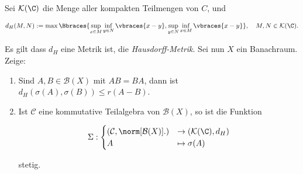 \begin{exercise}[22/2$^\ast$]

Sei $\mathcal{K}(\C)$ die Menge aller kompakten Teilmengen von $C$, und

\begin{align*}
  d_H(M, N)
  :=
  \max \Bbraces
  {
    \sup_{x \in M} \inf_{y \in N} \vbraces{x - y},
    \sup_{y \in N} \inf_{x \in M} \vbraces{x - y}
  },
  \quad
  M, N \in \mathcal{K}(\C).
\end{align*}

Es gilt dass $d_H$ eine Metrik ist, die \textit{Hausdorff-Metrik}.
Sei nun $X$ ein Banachraum.
Zeige:

\begin{enumerate}[label = (\alph*)]

  \item
  Sind $A, B \in \mathcal{B}(X)$ mit $A B = B A$, dann ist $d_H(\sigma(A), \sigma(B)) \leq r(A - B)$.

  \item
  Ist $\mathcal{C}$ eine kommutative Teilalgebra von $\mathcal{B}(X)$, so ist die Funktion

  \begin{align*}
    \Sigma:
    \begin{cases}
      (\mathcal{C}, \norm[\mathcal{B}(X)]{.}) & \to (\mathcal{K}(\C), d_H) \\
      A & \mapsto \sigma(A)
    \end{cases}
  \end{align*}

  stetig.

\end{enumerate}

\end{exercise}

